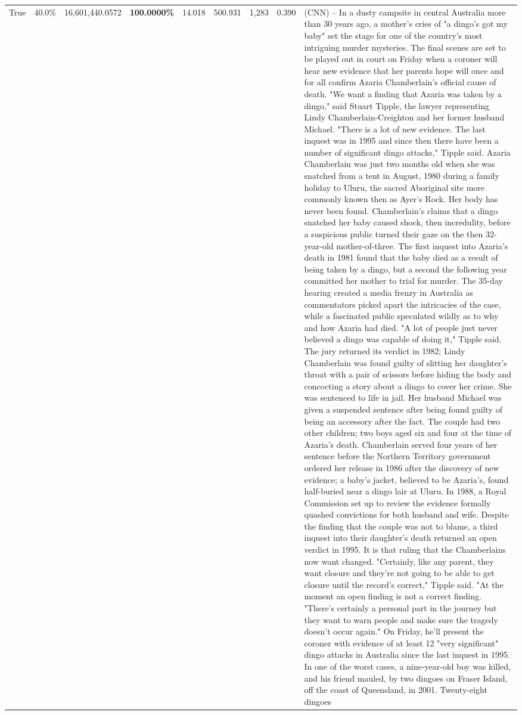\begin{table}[H]
\begin{tabular}{lllrlllll}
True & 40.0\% & 16,601,440.0572 & \bfseries \color{red} 100.0000\% & 14.018 & 500.931 & 1,283 & 0.390 & (CNN) -- In a dusty campsite in central Australia more than 30 years ago, a mother's cries of "a dingo's got my baby" set the stage for one of the country's most intriguing murder mysteries. The final scenes are set to be played out in court on Friday when a coroner will hear new evidence that her parents hope will once and for all confirm Azaria Chamberlain's official cause of death. "We want a finding that Azaria was taken by a dingo," said Stuart Tipple, the lawyer representing Lindy Chamberlain-Creighton and her former husband Michael. "There is a lot of new evidence. The last inquest was in 1995 and since then there have been a number of significant dingo attacks," Tipple said. Azaria Chamberlain was just two months old when she was snatched from a tent in August, 1980 during a family holiday to Uluru, the sacred Aboriginal site more commonly known then as Ayer's Rock. Her body has never been found. Chamberlain's claims that a dingo snatched her baby caused shock, then incredulity, before a suspicious public turned their gaze on the then 32-year-old mother-of-three. The first inquest into Azaria's death in 1981 found that the baby died as a result of being taken by a dingo, but a second the following year committed her mother to trial for murder. The 35-day hearing created a media frenzy in Australia as commentators picked apart the intricacies of the case, while a fascinated public speculated wildly as to why and how Azaria had died. "A lot of people just never believed a dingo was capable of doing it," Tipple said. The jury returned its verdict in 1982; Lindy Chamberlain was found guilty of slitting her daughter's throat with a pair of scissors before hiding the body and concocting a story about a dingo to cover her crime. She was sentenced to life in jail. Her husband Michael was given a suspended sentence after being found guilty of being an accessory after the fact. The couple had two other children; two boys aged six and four at the time of Azaria's death. Chamberlain served four years of her sentence before the Northern Territory government ordered her release in 1986 after the discovery of new evidence; a baby's jacket, believed to be Azaria's, found half-buried near a dingo lair at Uluru. In 1988, a Royal Commission set up to review the evidence formally quashed convictions for both husband and wife. Despite the finding that the couple was not to blame, a third inquest into their daughter's death returned an open verdict in 1995. It is that ruling that the Chamberlains now want changed. "Certainly, like any parent, they want closure and they're not going to be able to get closure until the record's correct," Tipple said. "At the moment an open finding is not a correct finding. "There's certainly a personal part in the journey but they want to warn people and make sure the tragedy doesn't occur again." On Friday, he'll present the coroner with evidence of at least 12 "very significant" dingo attacks in Australia since the last inquest in 1995. In one of the worst cases, a nine-year-old boy was killed, and his friend mauled, by two dingoes on Fraser Island, off the coast of Queensland, in 2001. Twenty-eight dingoes 
\end{tabular}
\end{table}
